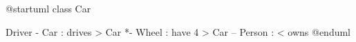\documentclass{scrartcl}
\begin{document}
\begin{plantuml}
@startuml
class Car

Driver - Car : drives >
Car *- Wheel : have 4 >
Car -- Person : < owns
@enduml
\end{plantuml}
\end{document}
